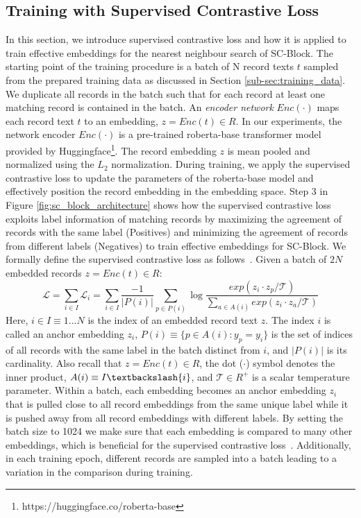 \documentclass[sigconf,nonacm]{acmart}
\begin{document}
\subsection{Training with Supervised Contrastive Loss}
\label{sub-sec:supervised_contrastive_loss}
In this section, we introduce supervised contrastive loss and how it is applied to train effective embeddings for the nearest neighbour search of SC-Block.
The starting point of the training procedure is a batch of N record texts $t$ sampled from the prepared training data as discussed in Section \ref{sub-sec:training_data}.
We duplicate all records in the batch such that for each record at least one matching record is contained in the batch.
An \textit{encoder network} $Enc(\cdot)$ maps each
record text $t$ to an embedding, $z = Enc(t) \in R$. 
In our experiments, the network encoder $Enc(\cdot)$ is a pre-trained roberta-base transformer model~\cite{liu_roberta_2019} provided by Huggingface\footnote{https://huggingface.co/roberta-base}.
The record embedding $z$ is mean pooled and normalized using the $L_2$ normalization. 
During training, we apply the supervised contrastive loss to update the parameters of the roberta-base model and effectively position the record embedding in the embedding space.
Step 3 in Figure \ref{fig:sc_block_architecture} shows how the supervised contrastive loss exploits label information of matching records by maximizing the agreement of records with the same label (Positives) and minimizing the agreement of records from different labels (Negatives) to train effective embeddings for SC-Block.
We formally define the supervised contrastive loss as follows~\cite{khosla_supervised_2020}.
Given a batch of $2N$ embedded records $z = Enc(t) \in R$:
\begin{equation}
    \mathcal{L} = \sum_{i \in I} \mathcal{L}_i = \sum_{i \in I} \frac{-1}{|P(i)|} \sum_{p \in P(i)} \log \frac{exp(z_i \cdot z_p/\mathcal{T})}{\sum_{a \in A(i)} exp(z_i \cdot z_a/\mathcal{T})}
\end{equation}
Here, $i \in I \equiv {1...N }$ is the index of an embedded record text $z$. 
The index $i$ is called an anchor embedding $z_i$, $P(i) \equiv \{p \in A(i): y_p = y_i\}$ is the set of indices of all records with the same label in the batch distinct from $i$, and $|P(i)|$ is its cardinality. Also recall that $z = Enc(t) \in R$, the dot ($\cdot$) symbol denotes the inner product, $A(i) \equiv I \textbackslash {i}$, and $\mathcal{T} \in R^+$ is a scalar temperature parameter. 
Within a batch, each embedding becomes an anchor embedding $z_i$ that is pulled close to all record embeddings from the same unique label while it is pushed away from all record embeddings with different labels. By setting the batch size to 1024 we make sure that each embedding is compared to many other embeddings, which is beneficial for the supervised contrastive loss~\cite{khosla_supervised_2020}. Additionally, in each training epoch, different records are sampled into a batch leading to a variation in the comparison during training.
\end{document}
